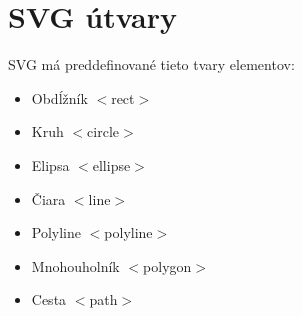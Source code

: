 \section{SVG útvary} 

\acs*{SVG} má preddefinované tieto tvary elementov:
\begin{itemize}
	\item Obdĺžník $<$rect$>$
	\item Kruh $<$circle$>$
	\item Elipsa $<$ellipse$>$
	\item Čiara $<$line$>$
	\item Polyline $<$polyline$>$
	\item Mnohouholník $<$polygon$>$
	\item Cesta $<$path$>$	
\end{itemize}

